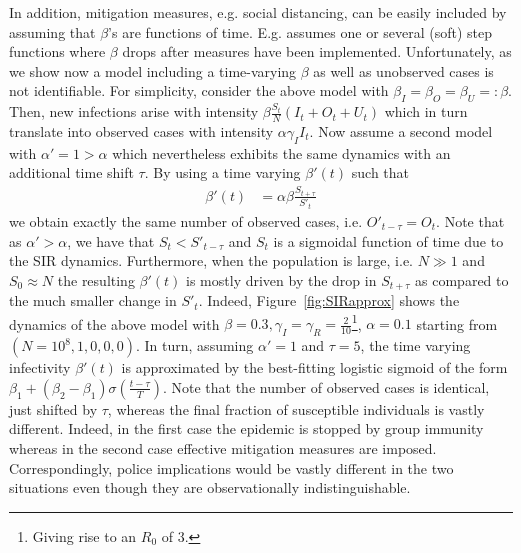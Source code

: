 \documentclass[fullpage,a4paper]{article}
\newcommand{\fig}[1]{Figure~\ref{fig:#1}}
\begin{document}
In addition, mitigation measures, e.g. social distancing, can be
easily included by assuming that $\beta$'s are functions of
time. E.g. \cite{arxiv:2004.01105} assumes one or several (soft) step
functions where $\beta$ drops after measures have been
implemented. Unfortunately, as we show now a model including a
time-varying $\beta$ as well as unobserved cases is not identifiable.
For simplicity, consider the above model with $\beta_I = \beta_O =
\beta_U =: \beta$. Then, new infections arise with intensity $\beta
\frac{S_t}{N} (I_t + O_t + U_t)$ which in turn translate into observed
cases with intensity $\alpha \gamma_I I_t$. Now assume a second model
with $\alpha' = 1 > \alpha$ which nevertheless exhibits the same
dynamics with an additional time shift $\tau$. By using a time varying
$\beta'(t)$ such that
\begin{align*}
  \beta'(t) &= \alpha \beta \frac{S_{t + \tau}}{S'_t}
\end{align*}
we obtain exactly the same number of observed cases, i.e. $O'_{t -
  \tau} = O_{t}$. Note that as $\alpha' > \alpha$, we have that
$S_{t} < S'_{t-\tau}$ and $S_t$ is a sigmoidal function of time due to
the SIR dynamics. Furthermore, when the population is large, i.e. $N
\gg 1$ and $S_0 \approx N$ the resulting $\beta'(t)$ is mostly driven
by the drop in $S_{t+\tau}$ as compared to the much smaller change in
$S'_t$. Indeed, \fig{SIRapprox} shows the dynamics of the above model
with $\beta = 0.3, \gamma_I = \gamma_R = \frac{2}{10}$\footnote{Giving
  rise to an $R_0$ of $3$.}, $\alpha = 0.1$ starting from $(N = 10^8,
1, 0, 0, 0)$. In turn, assuming $\alpha' = 1$ and $\tau = 5$, the time
varying infectivity $\beta'(t)$ is approximated by the best-fitting
logistic sigmoid of the form $\beta_1 + (\beta_2 - \beta_1)
\sigma(\frac{t - \tau}{T})$. Note that the number of observed cases is
identical, just shifted by $\tau$, whereas the final fraction of susceptible
individuals is vastly different. Indeed, in the first case the
epidemic is stopped by group immunity whereas in the second case
effective mitigation measures are imposed. Correspondingly, police
implications would be vastly different in the two situations even
though they are observationally indistinguishable.
\end{document}
